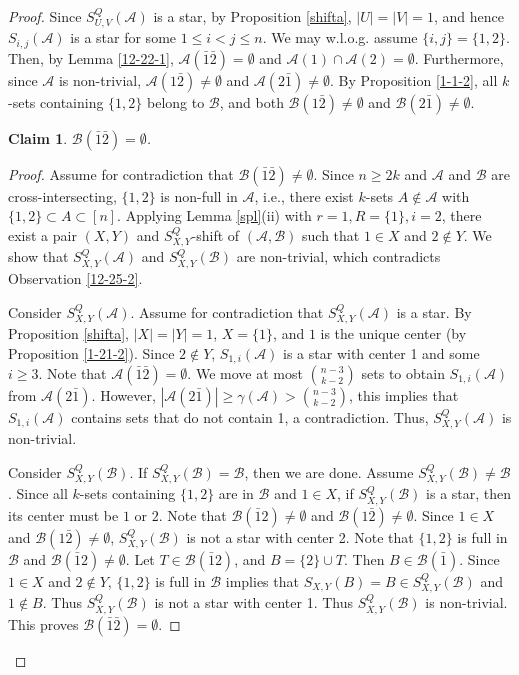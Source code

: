 \documentclass[a4paper,11pt]{article}
\newtheorem{claim}[theorem]{Claim}
\newcommand{\m}{\mathcal}
\begin{document}
\begin{proof}
Since $S_{U,V}^Q(\mathcal{A})$ is a star, by Proposition \ref{shifta}, $|U|=|V|=1$, and hence $S_{i,j}(\m A)$ is a star for some $1\le i<j \le n$. We may w.l.o.g. assume $\{i,j\}=\{1,2\}$.
Then, by Lemma \ref{12-22-1}, $\mathcal{A}(\bar{1}\bar{2})=\emptyset$ and $\mathcal{A}(1)\cap \mathcal{A}(2)=\emptyset$. Furthermore, since $\m A$ is non-trivial, $\mathcal{A}(1\bar{2})\ne \emptyset$ and $\mathcal{A}(2\bar{1})\ne \emptyset$.
By Proposition \ref{1-1-2}, all $k$-sets containing $\{1,2\}$ belong to $\mathcal{B}$, and both $\mathcal{B}(1\bar{2})\ne \emptyset$ and $\mathcal{B}(2\bar{1})\ne \emptyset$.


\begin{claim}\label{b12empty}
    $\mathcal{B}(\bar{1}\bar{2})=\emptyset$.
\end{claim}
\begin{proof}
Assume for contradiction that $\mathcal{B}(\bar{1}\bar{2})\ne \emptyset$. 
Since $n\ge 2k$ and $\m A$ and $\m B$ are cross-intersecting, $\{1,2\}$ is non-full in $\m A$, i.e., 
there exist $k$-sets $A\not\in \m A$ with $\{1,2\}\subset A \subset [n]$. 
Applying Lemma \ref{spl}(ii) with $r=1, R=\{1\}, i=2$, there exist a pair $(X, Y)$ and $S^{Q}_{X,Y}$-shift of $(\m A, \m B)$ such that $1\in X$ and $2\not\in Y$. 
We show that $S^{Q}_{X,Y}(\mathcal{A})$ and $S^{Q}_{X,Y}(\mathcal{B})$ are non-trivial, which contradicts Observation \ref{12-25-2}. 

Consider $S^{Q}_{X,Y}(\mathcal{A})$. 
Assume for contradiction that $S^{Q}_{X,Y}(\mathcal{A})$ is a star. 
By Proposition \ref{shifta}, $|X|=|Y|=1$, $X=\{1\}$, and $1$ is the unique center (by Proposition \ref{1-21-2}).  Since $2\not\in Y$, $S_{1,i}(\m A)$ is a star with center 1 and some $i\ge 3$.
Note that $\mathcal{A}(\bar1 \bar 2)=\emptyset$. 
We move at most ${n-3\choose k-2}$ sets to obtain $S_{1,i}(\m A)$ from $\mathcal{A}(2\bar{1})$. 
However, $|\mathcal{A}(2\bar{1})|\ge \gamma(\mathcal{A})> {n-3\choose k-2}$, this implies that $S_{1,i}(\mathcal{A})$ contains sets that do not contain 1, a contradiction. 
Thus, $S^{Q}_{X,Y}(\mathcal{A})$ is non-trivial. 

Consider $S^{Q}_{X,Y}(\m B)$. If $S^{Q}_{X,Y}(\m B)=\m B$, then we are done. Assume $S^{Q}_{X,Y}(\m B)\ne \m B$.
Since all $k$-sets containing $\{1,2\}$ are in $\mathcal{B}$ and $1\in X$, 
if $S^{Q}_{X,Y}(\mathcal{B})$ is a star, then its center must be $1$ or $2$. 
Note that $\m B(\bar12)\ne \emptyset$ and $\m B(1\bar 2)\ne \emptyset$.
Since $1\in X$ and $\m B(1\bar 2)\ne \emptyset$, $S^{Q}_{X,Y}(\mathcal{B})$ is not a star with center 2.
Note that $\{1,2\}$ is full in $\m B$ and $\m B(\bar12)\ne \emptyset$. 
Let $T\in \m B(\bar12)$, and $B=\{2\}\cup T$. Then $B\in \m B(\bar 1)$.
Since $1\in X$ and $2\not\in Y$, $\{1,2\}$ is full in $\m B$ implies that 
$S_{X,Y}(B)=B\in S^{Q}_{X,Y}(\mathcal{B})$ and $1\not\in B$. Thus
$S^{Q}_{X,Y}(\mathcal{B})$ is not a star with center 1. 
Thus $S^{Q}_{X,Y}(\mathcal{B})$ is non-trivial. 
This proves $\mathcal{B}(\bar{1}\bar{2})=\emptyset$.
\end{proof}


\end{proof}
\end{document}
